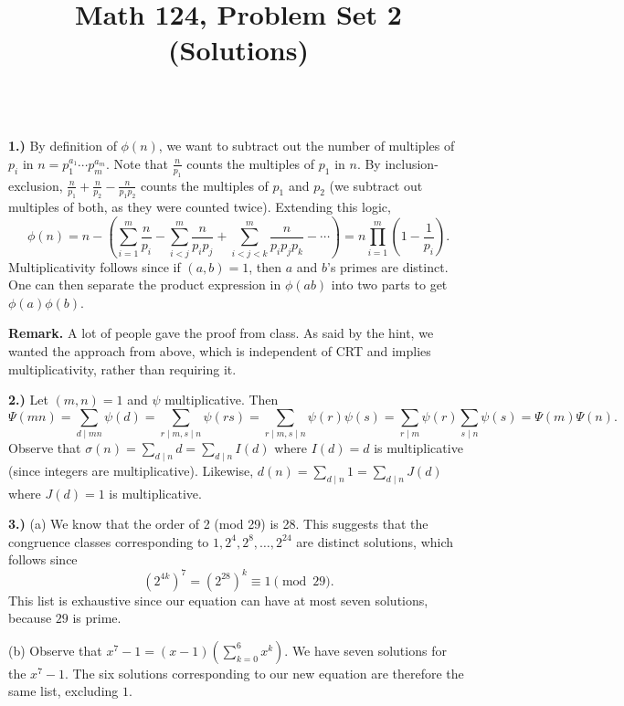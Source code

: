 \documentclass[10pt]{amsart}
\title{Math 124, Problem Set 2 (Solutions)}
\begin{document}
\maketitle

\\

{\bf 1.)} By definition of $\phi(n)$, we want to subtract out the number of multiples of $p_i$ in $n = p_1^{a_1} \dotsb p_m^{a_m}$. Note that $\frac{n}{p_1}$ counts the multiples of $p_1$ in $n$. By inclusion-exclusion, $\frac{n}{p_1} + \frac{n}{p_2} - \frac{n}{p_1p_2}$ counts the multiples of $p_1$ and $p_2$ (we subtract out multiples of both, as they were counted twice). Extending this logic,
\[
\phi(n) = n - \left(\sum_{i=1}^{m} \frac{n}{p_i} - \sum_{i<j}^{m} \frac{n}{p_i p_j} + \sum_{i<j<k}^{m} \frac{n}{p_i p_j p_k} - \dotsb\right) = n \prod_{i=1}^{m} \left(1 - \frac{1}{p_i}\right).
\]
Multiplicativity follows since if $(a,b) = 1$, then $a$ and $b$'s primes are distinct. One can then separate the product expression in $\phi(ab)$ into two parts to get $\phi(a)\phi(b)$.

\smallskip

\textbf{Remark.} A lot of people gave the proof from class. As said by the hint, we wanted the approach from above, which is independent of CRT and implies multiplicativity, rather than requiring it.

\medskip

{\bf 2.)} Let $(m,n) = 1$ and $\psi$ multiplicative. Then
\[
\Psi(mn) = \sum_{d \mid mn} \psi(d) = \sum_{r \mid m, s \mid n} \psi(rs) = \sum_{r \mid m, s \mid n} \psi(r)\psi(s) = \sum_{r \mid m} \psi(r) \sum_{s \mid n} \psi(s) = \Psi(m)\Psi(n).
\]
Observe that $\sigma(n) = \sum_{d\mid n} d = \sum_{d\mid n} I(d)$ where $I(d) = d$ is multiplicative (since integers are multiplicative). Likewise, $d(n) = \sum_{d\mid n} 1 = \sum_{d\mid n} J(d)$ where $J(d) = 1$ is multiplicative.

\medskip

{\bf 3.)} (a) We know that the order of 2 (mod 29) is 28. This suggests that the congruence classes corresponding to $1, 2^4, 2^8, \dotsc, 2^{24}$ are distinct solutions, which follows since
\[
(2^{4k})^{7} = (2^{28})^k \equiv 1 \pmod{29}.
\]
This list is exhaustive since our equation can have at most seven solutions, because $29$ is prime.

\smallskip

(b) Observe that $x^7 - 1 = (x-1)(\sum_{k=0}^6 x^k)$. We have seven solutions for the $x^7 - 1$. The six solutions corresponding to our new equation are therefore the same list, excluding $1$.
\end{document}
